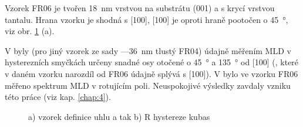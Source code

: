 Vzorek FR06 je tvořen \SI{18}{\nano\meter} vrstvou  na substrátu (001) a s krycí vrstvou tantalu.
Hrana vzorku je shodná s  [100],  [100] je oproti hraně pootočen o \SI{45}{\degree}, viz obr. \ref{fig:vzorek-ferh} (a).

V  byly (pro jiný vzorek ze sady ---\tododash \SI{36}{\nano\meter} tlustý FR04) údajně měřením MLD v hysterezních smyčkách určeny snadné osy otočené o \SI{45}{\degree} a \SI{135}{\degree} od  [100] (, které v daném vzorku narozdíl od FR06 údajně splývá s  [100]).
V  bylo ve vzorku FR06 měřeno spektrum MLD v rotujícím poli.
Neuspokojivé výsledky zavdaly vzniku této práce (viz kap. \ref{chap:4}).

\begin{figure}[htbp]
    \centering
    \caption{a) vzorek definice uhlu a tak b) R hystereze kubas}
    \label{fig:vzorek-ferh}
\end{figure}
